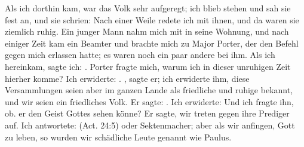 Als ich dorthin kam, war das Volk
sehr aufgeregt; ich blieb stehen und sah sie fest an, und sie
schrien:  Nach einer Weile redete ich mit
ihnen, und da waren sie ziemlich ruhig. Ein junger Mann nahm
mich mit in seine Wohnung, und nach einiger Zeit kam ein 
Beamter und brachte mich zu Major Porter, 
der den Befehl gegen mich erlassen hatte; es waren noch ein 
paar andere bei ihm. Als
ich hereinkam, sagte ich: . Porter fragte
mich, warum ich in dieser unruhigen Zeit hierher komme? Ich
erwiderte: . , sagte er; ich erwiderte
ihm, diese Versammlungen seien aber im ganzen Lande als 
friedliche und ruhige bekannt, und wir seien ein friedliches Volk. Er
sagte: . Ich erwiderte: 
Und ich fragte ihn, ob. 
er den Geist Gottes sehen könne? Er sagte, wir treten gegen
ihre Prediger auf. Ich antwortete:  (Act. 24:5) oder Sektenmacher; aber als wir
anfingen, Gott zu leben, so wurden wir schädliche Leute genannt
wie Paulus. 


